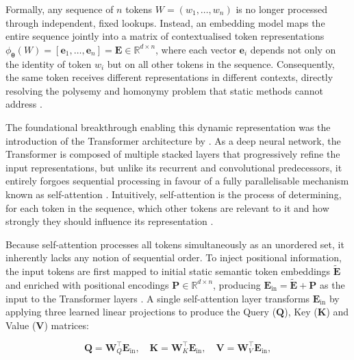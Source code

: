 Formally, any sequence of $n$ tokens $W = (w_1, \dots, w_n)$ is no longer processed through independent, fixed lookups. Instead, an embedding model maps the entire sequence jointly into a matrix of contextualised token representations $\phi_{\boldsymbol{\theta}}(W) = [\mathbf{e}_1, \dots, \mathbf{e}_n] = \mathbf{E} \in \mathbb{R}^{d \times n}$, where each vector $\mathbf{e}_i$ depends not only on the identity of token $w_i$ but on all other tokens in the sequence. Consequently, the same token receives different representations in different contexts, directly resolving the polysemy and homonymy problem that static methods cannot address \cite{peters_2018_deep,ethayarajh-2019-contextual}.

The foundational breakthrough enabling this dynamic representation was the introduction of the Transformer architecture by \citet{Vaswani2017}. As a deep neural network, the Transformer is composed of multiple stacked layers that progressively refine the input representations, but unlike its recurrent and convolutional predecessors, it entirely forgoes sequential processing in favour of a fully parallelisable mechanism known as self-attention \cite[p. 357 f.]{Bishop2024}. Intuitively, self-attention is the process of determining, for each token in the sequence, which other tokens are relevant to it and how strongly they should influence its representation \cite[p. 357 f.]{Bishop2024}\cite[p. 208 f.]{Goldberg2017}\cite{Vaswani2017}. 

Because self-attention processes all tokens simultaneously as an unordered set, it inherently lacks any notion of sequential order. To inject positional information, the input tokens are first mapped to initial static semantic token embeddings $\tilde{\mathbf{E}}$ and enriched with positional encodings $\mathbf{P} \in \mathbb{R}^{d \times n}$, producing $\mathbf{E}_{\text{in}} = \tilde{\mathbf{E}} + \mathbf{P}$ as the input to the Transformer layers \cite[p. 174 f.]{Jurafsky2024_SLP}\cite[p. 213 f.]{prince2023understanding}\cite{Vaswani2017}. A single self-attention layer transforms $\mathbf{E}_{\text{in}}$ by applying three learned linear projections to produce the Query ($\mathbf{Q}$), Key ($\mathbf{K}$) and Value ($\mathbf{V}$) matrices:

\vspace{-1em}
\[
\mathbf{Q} = \mathbf{W}_Q^\top \mathbf{E}_{\text{in}}, \quad  \mathbf{K} = \mathbf{W}_K^\top \mathbf{E}_{\text{in}}, \quad  \mathbf{V} = \mathbf{W}_V^\top \mathbf{E}_{\text{in}},
\]
\vspace{-1em}

